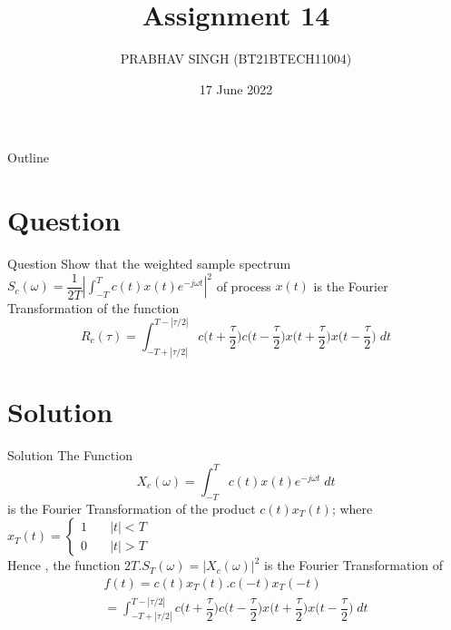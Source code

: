 \documentclass{beamer}
\title{Assignment 14}
\author{PRABHAV SINGH (BT21BTECH11004)}
\date{17 June 2022}
\begin{document}
	
	\begin{frame}
		\titlepage 
	\end{frame}
	
	\logo{}
	
	
	\begin{frame}{Outline}
		\tableofcontents
	\end{frame}
	
	\section{Question}
	\begin{frame}{Question}
	Show that the weighted sample spectrum $ S_{c}(\omega)  = \dfrac{1}{2T}{|\int_{-T}^{T}c(t)x(t)e^{-j{\omega}t}|}^2 $ of process $ x(t) $ is the Fourier Transformation of the function\\
	\begin{equation}
		R_{c}(\tau) =\int_{-T+|\tau/2|}^{T-|\tau/2|} c\bigg(t+\dfrac{{\tau}}{2}\bigg)c\bigg(t-\dfrac{{\tau}}{2}\bigg)x\bigg(t+\dfrac{{\tau}}{2}\bigg)x\bigg(t-\dfrac{{\tau}}{2}\bigg)\;dt
	\end{equation}
	\end{frame}
	
	
	\section{Solution}
	\begin{frame}{Solution}
	The Function 
	\begin{equation}
		X_{c}(\omega)=\int_{-T}^{T}c(t)x(t)e^{-j{\omega}t}\;dt
	\end{equation}
	is the Fourier Transformation of the product $ c(t)x_{T}(t) $; where $  x_{T}(t)=\left\{
	\begin{array}{ll}
		1 & \quad |t| < T  \\
		0 & \quad |t| > T 
	\end{array}
	\right. $\\
	Hence , the function $ 2T.S_{T}(\omega) = 	{|X_{c}(\omega)|}^2 $ is the Fourier Transformation of \\
	\begin{align}
		f(t)= {c(t)x_{T}(t)}.c(-t)x_{T}(-t)  \\ 
		=\int_{-T+|\tau/2|}^{T-|\tau/2|} c\bigg(t+\dfrac{{\tau}}{2}\bigg)c\bigg(t-\dfrac{{\tau}}{2}\bigg)x\bigg(t+\dfrac{{\tau}}{2}\bigg)x\bigg(t-\dfrac{{\tau}}{2}\bigg)\;dt 
	\end{align}
	\end{frame} 
	
\end{document}

